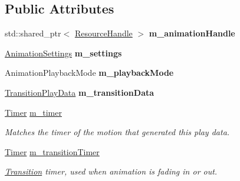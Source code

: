 \subsection*{Public Attributes}
\begin{DoxyCompactItemize}
\item 
\mbox{\label{structrev_1_1_animation_play_data_ac8f7f030306298fd45b0b566d1e2b5c9}} 
std\+::shared\+\_\+ptr$<$ \mbox{\hyperlink{classrev_1_1_resource_handle}{Resource\+Handle}} $>$ {\bfseries m\+\_\+animation\+Handle}
\item 
\mbox{\label{structrev_1_1_animation_play_data_a71181e424cd347fcb1806b2e81c32662}} 
\mbox{\hyperlink{structrev_1_1_animation_settings}{Animation\+Settings}} {\bfseries m\+\_\+settings}
\item 
\mbox{\label{structrev_1_1_animation_play_data_a5be3d9ba1bf048db21ef2e736a1ca645}} 
Animation\+Playback\+Mode {\bfseries m\+\_\+playback\+Mode}
\item 
\mbox{\label{structrev_1_1_animation_play_data_a716d9133b04ff1cb3317d45e32631e06}} 
\mbox{\hyperlink{structrev_1_1_transition_play_data}{Transition\+Play\+Data}} {\bfseries m\+\_\+transition\+Data}
\item 
\mbox{\label{structrev_1_1_animation_play_data_aeddbe4e442637fe29567cba04d385611}} 
\mbox{\hyperlink{classrev_1_1_timer}{Timer}} \mbox{\hyperlink{structrev_1_1_animation_play_data_aeddbe4e442637fe29567cba04d385611}{m\+\_\+timer}}
\begin{DoxyCompactList}\small\item\em Matches the timer of the motion that generated this play data. \end{DoxyCompactList}\item 
\mbox{\label{structrev_1_1_animation_play_data_a7cb6b309260394609126639957ac403b}} 
\mbox{\hyperlink{classrev_1_1_timer}{Timer}} \mbox{\hyperlink{structrev_1_1_animation_play_data_a7cb6b309260394609126639957ac403b}{m\+\_\+transition\+Timer}}
\begin{DoxyCompactList}\small\item\em \mbox{\hyperlink{struct_transition}{Transition}} timer, used when animation is fading in or out. \end{DoxyCompactList}\item 

\end{DoxyCompactItemize}

